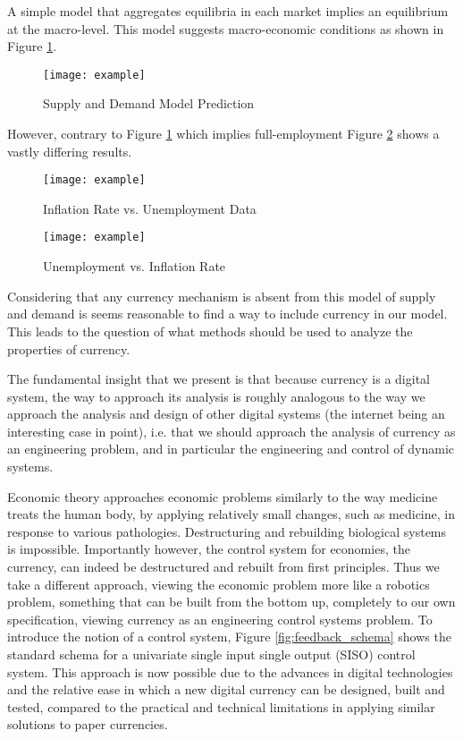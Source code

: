 A simple model that aggregates equilibria in each market implies an equilibrium at the macro-level.
This model suggests macro-economic conditions as shown in Figure
\ref{fig:supply_and_demand_prediction}.

\begin{figure}
\centering
\texttt{[image: example]}
\caption{Supply and Demand Model Prediction}
\label{fig:supply_and_demand_prediction}
\end{figure}

However, contrary to Figure \ref{fig:supply_and_demand_prediction} which implies full-employment
Figure \ref{fig:ui_all_data} shows a vastly differing results.

\begin{figure}
\centering
\texttt{[image: example]}
\caption{Inflation Rate vs. Unemployment Data}
\label{fig:ui_all_data}
\end{figure}

\begin{figure}
\centering
\texttt{[image: example]}
\caption{Unemployment vs. Inflation Rate}
\label{fig:ui}
\end{figure}

Considering that any currency mechanism is absent from this model of supply and demand is seems
reasonable to find a way to include currency in our model. This leads to the question of what
methods should be used to analyze the properties of currency.

The fundamental insight that we present is that because currency is a digital system, the way to
approach its analysis is roughly analogous to the way we approach the analysis and design of other
digital systems (the internet being an interesting case in point), i.e. that we should approach the
analysis of currency as an engineering problem, and in particular the engineering and control of
dynamic systems. 

Economic theory approaches economic problems similarly to the way medicine treats the human body, by
applying relatively small changes, such as medicine, in response to various pathologies.
Destructuring and rebuilding biological systems is impossible. Importantly however, the control
system for economies, the currency, can indeed be destructured and rebuilt from first principles.
Thus we take a different approach, viewing the economic problem more like a robotics problem,
something that can be built from the bottom up, completely to our own specification, viewing
currency as an engineering control systems problem. To introduce the notion of a control system,
Figure \ref{fig:feedback_schema} shows the standard schema for a univariate single input single
output (SISO) control system. This approach is now possible due to the advances in digital
technologies and the relative ease in which a new digital currency can be designed, built and
tested, compared to the practical and technical limitations in applying similar solutions to paper
currencies.

